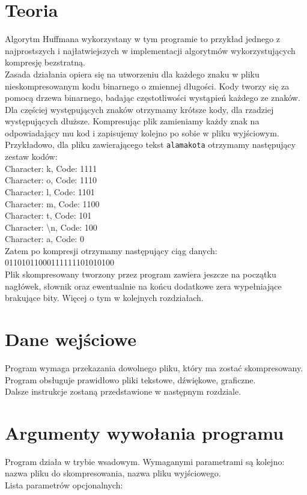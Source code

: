 \documentclass[]{article}
\begin{document}
\section{Teoria}\label{header-n281}
Algorytm Huffmana wykorzystany w tym programie to przykład jednego z najprostszych i najłatwiejszych w implementacji algorytmów wykorzystujących kompresję bezstratną.\\
Zasada działania opiera się na utworzeniu dla każdego znaku w pliku nieskompresowanym kodu binarnego o zmiennej długości. Kody tworzy się za pomocą drzewa binarnego, badając częstotliwości wystąpień każdego ze znaków. Dla częściej występujących znaków otrzymamy krótsze kody, dla rzadziej występujących dłuższe. Kompresując plik zamieniamy każdy znak na odpowiadający  mu kod i zapisujemy kolejno po sobie w pliku wyjściowym.\\
Przykładowo, dla pliku zawierającego tekst \texttt{alamakota} otrzymamy następujący zestaw kodów:\\
Character: k, Code: 1111\\
Character: o, Code: 1110\\
Character: l, Code: 1101\\
Character: m, Code: 1100\\
Character: t, Code: 101\\
Character: \textbackslash n, Code: 100\\
Character: a, Code: 0\\
Zatem po kompresji otrzymamy następujący ciąg danych: \\
01101011000111111101010100\\
Plik skompresowany tworzony przez program zawiera jeszcze na początku nagłówek, słownik oraz ewentualnie na końcu dodatkowe zera wypełniające brakujące bity. Więcej o tym w kolejnych rozdziałach.
\section{Dane wejściowe}\label{header-n233}
Program wymaga przekazania dowolnego pliku, który ma zostać skompresowany. Program obsługuje prawidłowo pliki tekstowe, dźwiękowe, graficzne.  \\Dalsze instrukcje zostaną przedstawione w następnym rozdziale.
\section{Argumenty wywołania programu}\label{header-n256}

Program działa w trybie wsadowym. Wymaganymi parametrami są kolejno: nazwa pliku do skompresowania, nazwa pliku wyjściowego.
\\Lista parametrów opcjonalnych:
\end{document}
